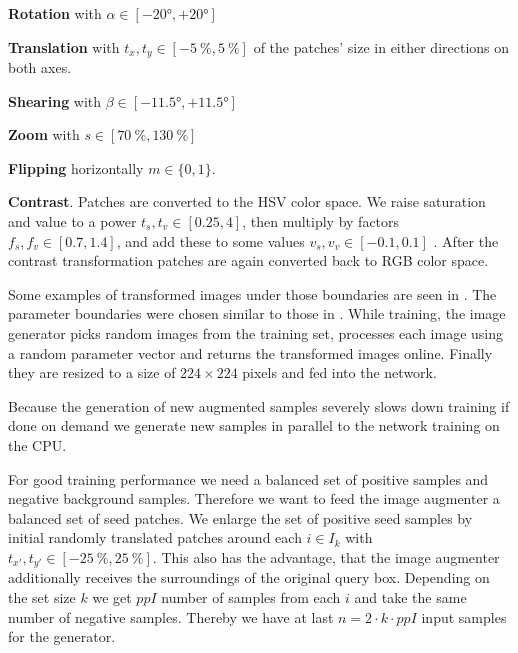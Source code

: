 \begin{my_list_item}
    \item \textbf{Rotation} with $\alpha\in[-\ang{20}, +\ang{20}]$
    \item \textbf{Translation} with $t_x,t_y\in[-\SI{5}{\percent}, \SI{5}{\percent}]$ of the patches' size in either directions on both axes.
    \item \textbf{Shearing} with $\beta\in[-\ang{11.5}, + \ang{11.5}]$
    \item \textbf{Zoom} with $s\in[\SI{70}{\percent}, \SI{130}{\percent}]$
    \item \textbf{Flipping} horizontally $m\in\{0,1\}$.
    \item \textbf{Contrast}. Patches are converted to the HSV color space. We raise saturation and value to a power $t_s, t_v \in [0.25, 4]$, then multiply by factors $f_s, f_v \in [0.7, 1.4]$, and add these to some values $v_s, v_v \in [-0.1, 0.1]$ \citep{dosovitskiy_discriminative_2014}. After the contrast transformation patches are again converted back to RGB color space.
\end{my_list_item}
Some examples of transformed images under those boundaries are seen in . The parameter boundaries were chosen similar to those in \citet{dosovitskiy_discriminative_2014}. While training, the image generator picks random images from the training set, processes each image using a random parameter vector and returns the transformed images online. Finally they are resized to a size of $224\times 224$ pixels and fed into the network.

Because the generation of new augmented samples severely slows down training if done on demand we generate new samples in parallel to the network training on the CPU.

For good training performance we need a balanced set of positive samples and negative background samples. Therefore we want to feed the image augmenter a balanced set of seed patches. We enlarge the set of positive seed samples by initial randomly translated patches around each $i\in I_k$ with $t_{x'},t_{y'}\in[-\SI{25}{\percent}, \SI{25}{\percent}]$. This also has the advantage, that the image augmenter additionally receives the surroundings of the original query box. Depending on the set size $k$ we get $ppI$ number of samples from each $i$ and take the same number of negative samples. Thereby we have at last $n = 2\cdot k \cdot ppI$ input samples for the generator.

